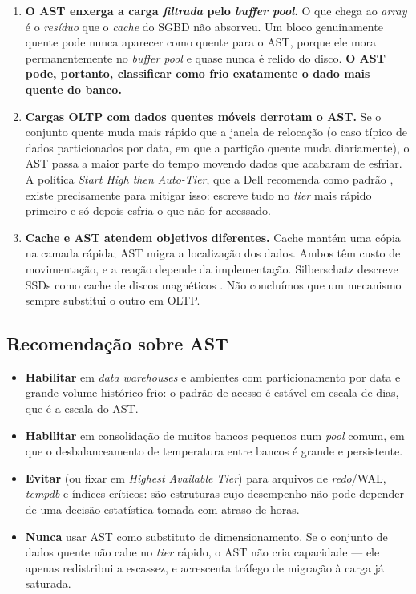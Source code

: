 \documentclass[11pt,a4paper]{article}
\begin{document}
\begin{enumerate}[leftmargin=0.9cm,itemsep=3pt]
\item \textbf{O AST enxerga a carga \emph{filtrada} pelo \textit{buffer pool}.} O que chega ao
\textit{array} é o \emph{resíduo} que o \textit{cache} do SGBD não absorveu. Um bloco genuinamente
quente pode nunca aparecer como quente para o AST, porque ele mora permanentemente no
\textit{buffer pool} e quase nunca é relido do disco. \textbf{O AST pode, portanto, classificar
como frio exatamente o dado mais quente do banco.}

\item \textbf{Cargas OLTP com dados quentes móveis derrotam o AST.} Se o conjunto quente muda mais
rápido que a janela de relocação (o caso típico de dados particionados por data, em que a partição
quente muda diariamente), o AST passa a maior parte do tempo movendo dados que acabaram de esfriar.
A política \textit{Start High then Auto-Tier}, que a Dell recomenda como padrão \cite{dellfast},
existe precisamente para mitigar isso: escreve tudo no \textit{tier} mais rápido primeiro e só
depois esfria o que não for acessado.

\item \textbf{Cache e AST atendem objetivos diferentes.} Cache mantém uma cópia na camada
rápida; AST migra a localização dos dados. Ambos têm custo de movimentação, e a reação
depende da implementação. Silberschatz descreve SSDs como cache de discos magnéticos
\cite{silberschatz2020}. Não concluímos que um mecanismo sempre substitui o outro em OLTP.
\end{enumerate}

\subsection{Recomendação sobre AST}

\begin{itemize}[leftmargin=0.7cm,itemsep=2pt]
\item \textbf{Habilitar} em \textit{data warehouses} e ambientes com particionamento por data e
grande volume histórico frio: o padrão de acesso é estável em escala de dias, que é a escala do
AST.
\item \textbf{Habilitar} em consolidação de muitos bancos pequenos num \textit{pool} comum, em que
o desbalanceamento de temperatura entre bancos é grande e persistente.
\item \textbf{Evitar} (ou fixar em \textit{Highest Available Tier}) para arquivos de
\textit{redo}/WAL, \textit{tempdb} e índices críticos: são estruturas cujo desempenho não pode
depender de uma decisão estatística tomada com atraso de horas.
\item \textbf{Nunca} usar AST como substituto de dimensionamento. Se o conjunto de dados quente não
cabe no \textit{tier} rápido, o AST não cria capacidade --- ele apenas redistribui a escassez, e
acrescenta tráfego de migração à carga já saturada.
\end{itemize}
\end{document}
